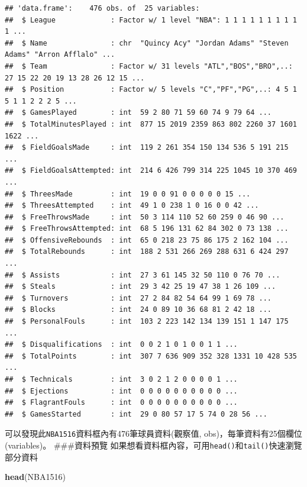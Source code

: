 \documentclass[]{book}
\newenvironment{Shaded}{\begin{snugshade}}{\end{snugshade}}
\newcommand{\KeywordTok}[1]{\textcolor[rgb]{0.13,0.29,0.53}{\textbf{{#1}}}}
\newcommand{\NormalTok}[1]{{#1}}
\theoremstyle{definition}
\theoremstyle{definition}
\theoremstyle{remark}
\begin{document}
\begin{verbatim}
## 'data.frame':    476 obs. of  25 variables:
##  $ League             : Factor w/ 1 level "NBA": 1 1 1 1 1 1 1 1 1 1 ...
##  $ Name               : chr  "Quincy Acy" "Jordan Adams" "Steven Adams" "Arron Afflalo" ...
##  $ Team               : Factor w/ 31 levels "ATL","BOS","BRO",..: 27 15 22 20 19 13 28 26 12 15 ...
##  $ Position           : Factor w/ 5 levels "C","PF","PG",..: 4 5 1 5 1 1 2 2 2 5 ...
##  $ GamesPlayed        : int  59 2 80 71 59 60 74 9 79 64 ...
##  $ TotalMinutesPlayed : int  877 15 2019 2359 863 802 2260 37 1601 1622 ...
##  $ FieldGoalsMade     : int  119 2 261 354 150 134 536 5 191 215 ...
##  $ FieldGoalsAttempted: int  214 6 426 799 314 225 1045 10 370 469 ...
##  $ ThreesMade         : int  19 0 0 91 0 0 0 0 0 15 ...
##  $ ThreesAttempted    : int  49 1 0 238 1 0 16 0 0 42 ...
##  $ FreeThrowsMade     : int  50 3 114 110 52 60 259 0 46 90 ...
##  $ FreeThrowsAttempted: int  68 5 196 131 62 84 302 0 73 138 ...
##  $ OffensiveRebounds  : int  65 0 218 23 75 86 175 2 162 104 ...
##  $ TotalRebounds      : int  188 2 531 266 269 288 631 6 424 297 ...
##  $ Assists            : int  27 3 61 145 32 50 110 0 76 70 ...
##  $ Steals             : int  29 3 42 25 19 47 38 1 26 109 ...
##  $ Turnovers          : int  27 2 84 82 54 64 99 1 69 78 ...
##  $ Blocks             : int  24 0 89 10 36 68 81 2 42 18 ...
##  $ PersonalFouls      : int  103 2 223 142 134 139 151 1 147 175 ...
##  $ Disqualifications  : int  0 0 2 1 0 1 0 0 1 1 ...
##  $ TotalPoints        : int  307 7 636 909 352 328 1331 10 428 535 ...
##  $ Technicals         : int  3 0 2 1 2 0 0 0 0 1 ...
##  $ Ejections          : int  0 0 0 0 0 0 0 0 0 0 ...
##  $ FlagrantFouls      : int  0 0 0 0 0 0 0 0 0 0 ...
##  $ GamesStarted       : int  29 0 80 57 17 5 74 0 28 56 ...
\end{verbatim}

可以發現此\texttt{NBA1516}資料框內有476筆球員資料(觀察值,
obs)，每筆資料有25個欄位 (variables)。 \#\#\#資料預覽
如果想看資料框內容，可用\texttt{head()}和\texttt{tail()}快速瀏覽部分資料

\begin{Shaded}
\begin{Highlighting}[]
\KeywordTok{head}\NormalTok{(NBA1516)}
\end{Highlighting}
\end{Shaded}
\end{document}
